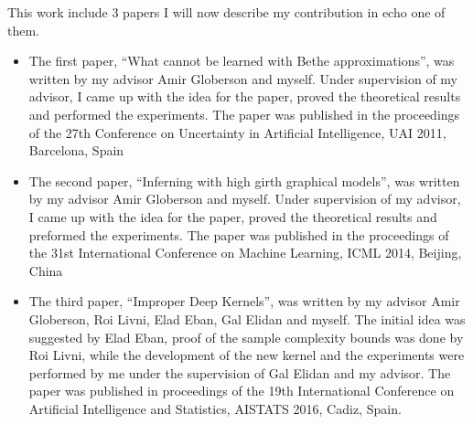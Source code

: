 This work include 3 papers I will now describe my contribution in echo one of them.
\begin{itemize}
\item
  The first paper, ``What cannot be learned with Bethe approximations'', was written by my advisor Amir Globerson and myself.
  Under supervision of my advisor, I came up with the idea for the paper, proved the theoretical results and performed the experiments.
  The paper was published in the proceedings of the 27th Conference on Uncertainty in Artificial Intelligence, UAI 2011, Barcelona, Spain
\item
  The second paper, ``Inferning with high girth graphical models'', was written by my advisor Amir Globerson and myself.
  Under supervision of my advisor, I came up with the idea for the paper, proved the theoretical results and preformed the experiments.
  The paper was published in the proceedings of the 31st International Conference on Machine Learning, ICML 2014, Beijing, China
\item
  The third paper, ``Improper Deep Kernels'', was written by my advisor Amir Globerson, Roi Livni, Elad Eban, Gal Elidan and myself.
  The initial idea was suggested by Elad Eban, proof of the sample complexity bounds was done by Roi Livni, while the development of the new kernel and the experiments were performed by me under the supervision of Gal Elidan and my advisor.
  The paper was published in proceedings of the 19th International Conference on Artificial Intelligence and Statistics, AISTATS 2016, Cadiz, Spain.
\end{itemize}
